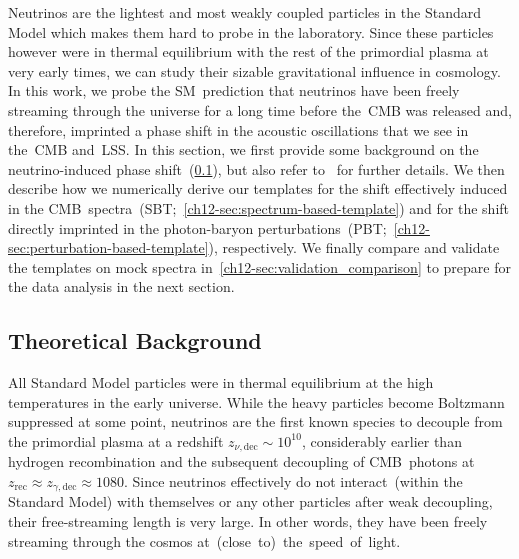 Neutrinos are the lightest and most weakly coupled particles in the Standard Model which makes them hard to probe in the laboratory. Since these particles however were in thermal equilibrium with the rest of the primordial plasma at very early times, we can study their sizable gravitational influence in cosmology. In this work, we probe the SM~prediction that neutrinos have been freely streaming through the universe for a long time before the~CMB was released and, therefore, imprinted a phase shift in the acoustic oscillations that we see in the~CMB and~LSS. In this section, we first provide some background on the neutrino-induced phase shift~(\textsection\ref{ch12-sec:background-theory}), but also refer to~\cite{Bashinsky:2003tk, Follin:2015hya, Baumann:2015rya, Wallisch:2018rzj} for further details. We then describe how we numerically derive our templates for the shift effectively induced in the CMB~spectra~(SBT;~\textsection\ref{ch12-sec:spectrum-based-template}) and for the shift directly imprinted in the photon-baryon perturbations~(PBT;~\textsection\ref{ch12-sec:perturbation-based-template}), respectively. We finally compare and validate the templates on mock spectra in~\textsection\ref{ch12-sec:validation_comparison} to prepare for the data analysis in the next section.


\subsection{Theoretical Background}
\label{ch12-sec:background-theory}

All Standard Model particles were in thermal equilibrium at the high temperatures in the early universe. While the heavy particles become Boltzmann suppressed at some point, neutrinos are the first known species to decouple from the primordial plasma at a redshift $z_{\nu, \mathrm{dec}} \sim 10^{10}$, considerably earlier than hydrogen recombination and the subsequent decoupling of CMB~photons at $z_\mathrm{rec} \approx z_{\gamma, \mathrm{dec}} \approx 1080$. Since neutrinos effectively do not interact~(within the Standard Model) with themselves or any other particles after weak decoupling, their free-streaming length is very large. In other words, they have been freely streaming through the cosmos \mbox{at~(close to) the speed of light}.\medskip

